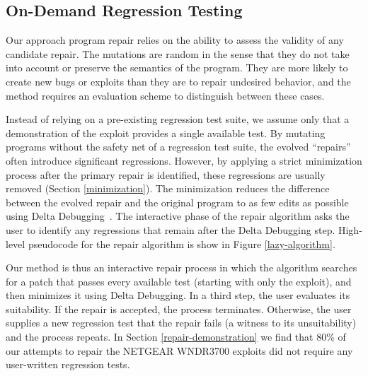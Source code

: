 \documentclass{sigcomm-alternate}
\begin{document}
\subsection{On-Demand Regression Testing}
\label{on-demand-regression}

Our approach program repair relies on the ability to
assess the validity of any candidate repair.  The mutations are random
in the sense that they do not take into account or preserve the
semantics of the program.  They are more likely to create new bugs
or exploits than they are to repair undesired behavior, and the method
requires an evaluation scheme to distinguish between these cases.

Instead of relying on a pre-existing regression test suite, we assume
only that a demonstration of the exploit provides a single available
test.  By mutating programs without the safety net of a regression
test suite, the evolved ``repairs'' often introduce significant
regressions.  However, by applying a strict minimization process after
the primary repair is identified, these regressions are usually
removed (Section \ref{minimization}).  The minimization reduces the
difference between the evolved repair and the original program to as
few edits as possible using Delta Debugging~\cite{delta}.  The
interactive phase of the repair algorithm asks the user to identify
any regressions that remain after the Delta Debugging step.
High-level pseudocode for the repair algorithm is show in Figure
\ref{lazy-algorithm}.

Our method is thus an interactive repair process in which the
algorithm searches for a patch that 
passes every available test (starting with only the exploit), and then
minimizes it using Delta Debugging.  In a third step,
the user evaluates its suitability.  If the repair is accepted, the process
terminates. Otherwise, the user supplies a new regression test that the repair
fails (a witness to its unsuitability) and the process repeats. 
In Section \ref{repair-demonstration} we find that 80\% of our
attempts to repair the NETGEAR WNDR3700 exploits did not require any
user-written regression tests.
\end{document}
